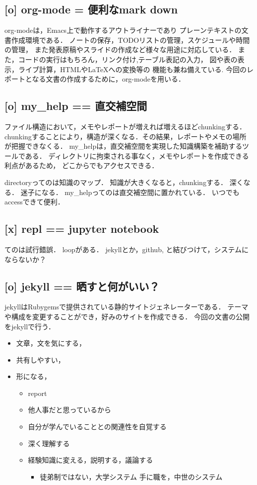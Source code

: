 \documentclass{hissymp}
\begin{document}
\subsection{[o] org-mode = 便利なmark down}
\label{sec:org8c394b8}
org-modeは，Emacs上で動作するアウトライナーであり
プレーンテキストの文書作成環境である．
ノートの保存，TODOリストの管理，スケジュールや時間の管理，
また発表原稿やスライドの作成など様々な用途に対応している．
また，コードの実行はもちろん，リンク付け,テーブル表記の入力，
図や表の表示，ライブ計算，HTMLや\LaTeX{}への変換等の
機能も兼ね備えている.
今回のレポートとなる文書の作成するために，org-modeを用いる．

\subsection{[o] my\_help == 直交補空間}
\label{sec:orge0e66ec}
ファイル構造において，メモやレポートが増えれば増えるほどchunkingする．
chunkingすることにより，構造が深くなる．その結果，レポートやメモの場所
が把握できなくる．
my\_helpは，直交補空間を実現した知識構築を補助するツールである．
ディレクトリに拘束される事なく，メモやレポートを作成できる利点があるため，
どこからでもアクセスできる．

directoryってのは知識のマップ．
知識が大きくなると，chunkingする．
深くなる．
迷子になる．
my\_helpってのは直交補空間に置かれている．
いつでもaccessできて便利．

\subsection{[x] repl == jupyter notebook}
\label{sec:org650416d}
てのは試行錯誤．
loopがある．
jekyllとか，github, と結びつけて，システムにならないか？

\subsection{[o] jekyll == 晒すと何がいい？}
\label{sec:org59dc7f7}
jekyllはRubygemsで提供されている静的サイトジェネレーターである．
テーマや構成を変更することができ，好みのサイトを作成できる．
今回の文書の公開をjekyllで行う．
\begin{itemize}
\item 文章，文を気にする，
\item 共有しやすい，
\item 形になる，
\begin{itemize}
\item report
\item 他人事だと思っているから
\item 自分が学んでいることとの関連性を自覚する
\item 深く理解する
\item 経験知識に変える，説明する，議論する
\begin{itemize}
\item 徒弟制ではない，大学システム
手に職を，中世のシステム
\end{itemize}
\end{itemize}
\end{itemize}
\end{document}

